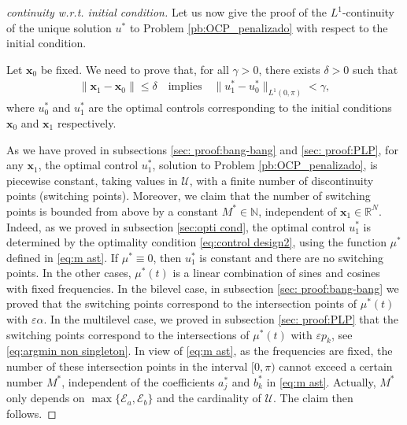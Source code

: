 \documentclass[twocolumn]{autart}    %
\begin{document}
\vspace{0.5em}
\begin{proof}[continuity w.r.t. initial condition]
	Let us now give the proof of the $L^1$-continuity of the unique solution $u^\ast$ to Problem \ref{pb:OCP_penalizado} with respect to the initial condition. 
	
	Let $\bm{x}_0$ be fixed. We need to prove that, for all $\gamma >0$, there exists $\delta >0$ such that 
	\begin{align*}
		\| \bm{x}_1-\bm{x}_0\| \leq \delta \quad \text{implies} \quad \| u^\ast_1 - u^\ast_0\|_{L^1(0,\pi)} <\gamma,
	\end{align*}
	where $u^\ast_0$ and $u^\ast_1$ are the optimal controls corresponding to the initial conditions $\bm{x}_0$ and $\bm{x}_1$ respectively. 
	
	As we have proved in subsections \ref{sec: proof:bang-bang} and \ref{sec: proof:PLP}, for any $\bm{x}_1$, the optimal control $u_1^\ast$, solution to Problem \ref{pb:OCP_penalizado}, is piecewise constant, taking values in $\mathcal{U}$, with a finite number of discontinuity points (switching points). Moreover, we claim that the number of switching points is bounded from above by a constant $M^\ast \in \mathbb{N}$, independent of  $\bm{x}_1\in \mathbb{R}^N$. Indeed, as we proved in subsection \ref{sec:opti cond}, the optimal control $u_1^\ast$ is determined by the optimality condition \eqref{eq:control design2}, using the function $\mu^\ast$ defined in \eqref{eq:m ast}. If $\mu^\ast \equiv 0$, then $u^\ast_1$ is constant and there are no switching points. In the other cases, $\mu^\ast(t)$ is a linear combination of sines and cosines with fixed frequencies.  In the bilevel case, in subsection \ref{sec: proof:bang-bang} we proved that the switching points correspond to the intersection points of $\mu^\ast(t)$ with $\varepsilon\alpha$. In the multilevel case, we proved in subsection \ref{sec: proof:PLP} that the switching points correspond to the intersections of $\mu^\ast(t)$ with $\varepsilon p_k$, see \eqref{eq:argmin non singleton}. In view of \eqref{eq:m ast}, as the frequencies are fixed, the number of these intersection points in the interval $[0,\pi)$ cannot exceed a certain number $M^\ast$, independent of the coefficients $a_j^\ast$ and $b_k^\ast$ in \eqref{eq:m ast}. Actually, $M^\ast$ only depends on  $\max\{\mathcal{E}_a, \mathcal{E}_b\}$ and the cardinality of $\mathcal U$. The claim then follows.
	

\end{proof}
\end{document}
